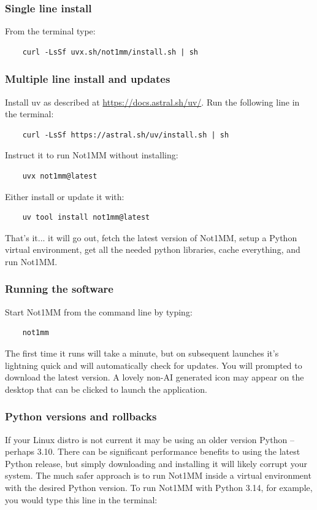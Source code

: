 \documentclass{article}
\begin{document}
\subsubsection{Single line install}
From the terminal type:
\begin{verbatim}
    curl -LsSf uvx.sh/not1mm/install.sh | sh
\end{verbatim}
\subsubsection{Multiple line install and updates}
Install uv as described at \url{https://docs.astral.sh/uv/}. Run the following line in the terminal:
\begin{verbatim}
    curl -LsSf https://astral.sh/uv/install.sh | sh
\end{verbatim}
Instruct it to run Not1MM without installing:
\begin{verbatim}
    uvx not1mm@latest
\end{verbatim}
Either install or update it with:
\begin{verbatim}
    uv tool install not1mm@latest
\end{verbatim}

\noindent That's it... it will go out, fetch the latest version of Not1MM, setup a Python virtual environment, get all the needed python libraries, cache everything, and run Not1MM. 
\subsubsection{Running the software}
Start Not1MM from the command line by typing: 
\begin{verbatim}
    not1mm
\end{verbatim}
The first time it runs will take a minute, but on subsequent launches it's lightning quick and will automatically check for updates. You will prompted to download the latest version. A lovely non-AI generated icon may appear on the desktop that can be clicked to launch the application.
\subsubsection{Python versions and rollbacks}
\label{subsec:rollback}
If your Linux distro is not current it may be using an older version Python -- perhaps 3.10. There can be significant performance benefits to using the latest Python release, but simply downloading and installing it will likely corrupt your system. The much safer approach is to run Not1MM inside a virtual environment with the desired Python version. To run Not1MM with Python 3.14, for example, you would type this line in the terminal:
\end{document}
